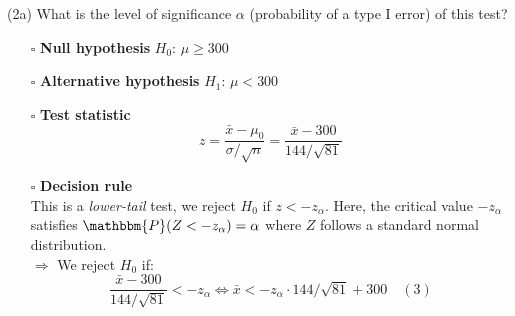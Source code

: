 \documentclass[
  11pt,
  ignorenonframetext,
]{beamer}
\begin{document}
\begin{frame}{(2a) What is the level of significance \(\alpha\)
\qquad \qquad \qquad \qquad (probability of a type I error) of this
test?}
\protect\hypertarget{a-what-is-the-level-of-significance-alpha-probability-of-a-type-i-error-of-this-test}{}
\begin{itemize}
    \item [$\square$] \textbf{Null hypothesis} $H_0$: $\mu \geq 300$\\
    \vspace{2mm}
    \item [$\square$] \textbf{Alternative hypothesis} $H_1$: $\mu < 300$\\
    \vspace{2mm}
    \item [$\square$] \textbf{Test statistic}
\small
$$
z = \frac{\bar{x}-\mu_0}{\sigma/\sqrt{n}} = \frac{\bar{x}-300}{144/\sqrt{81}}
$$
    \normalsize
    \item [$\square$] \textbf{Decision rule}\\ \small
    This is a \textit{lower-tail} test, we reject $H_0$ if $z < - z_\alpha$. Here, the critical value $-z_\alpha$ satisfies $\mathbbm{P}(Z<-z_\alpha) = \alpha$ where $Z$ follows a standard normal distribution.\\
    $\Rightarrow$ We reject $H_0$ if:
    $$
    \frac{\bar{x}-300}{144/\sqrt{81}} < - z_\alpha \Leftrightarrow \bar{x}< - z_\alpha\cdot 144/\sqrt{81} + 300 \quad (3)
    $$
\end{itemize}
\end{frame}
\end{document}
